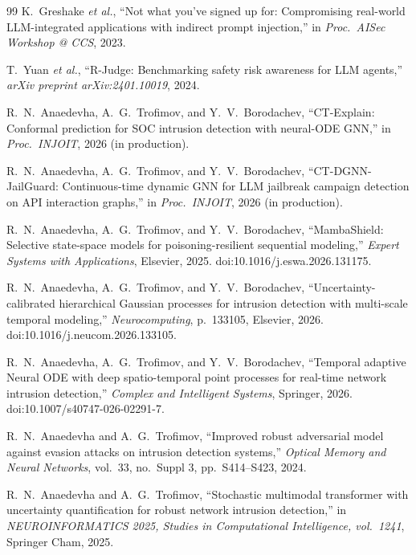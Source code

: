 \documentclass[12pt,a4paper]{article}
\theoremstyle{definition}
\theoremstyle{remark}
\begin{document}
\begin{thebibliography}{99}
K.~Greshake \emph{et al.}, ``Not what you've signed up for: Compromising real-world LLM-integrated applications with indirect prompt injection,'' in \emph{Proc.\ AISec Workshop @ CCS}, 2023.

T.~Yuan \emph{et al.}, ``{R-Judge}: Benchmarking safety risk awareness for LLM agents,'' \emph{arXiv preprint arXiv:2401.10019}, 2024.

R.~N.~Anaedevha, A.~G.~Trofimov, and Y.~V.~Borodachev, ``CT-Explain: Conformal prediction for SOC intrusion detection with neural-ODE GNN,'' in \emph{Proc.\ INJOIT}, 2026 (in production).

R.~N.~Anaedevha, A.~G.~Trofimov, and Y.~V.~Borodachev, ``{CT-DGNN-JailGuard}: Continuous-time dynamic GNN for LLM jailbreak campaign detection on API interaction graphs,'' in \emph{Proc.\ INJOIT}, 2026 (in production).

R.~N.~Anaedevha, A.~G.~Trofimov, and Y.~V.~Borodachev, ``{MambaShield}: Selective state-space models for poisoning-resilient sequential modeling,'' \emph{Expert Systems with Applications}, Elsevier, 2025. doi:10.1016/j.eswa.2026.131175.

R.~N.~Anaedevha, A.~G.~Trofimov, and Y.~V.~Borodachev, ``Uncertainty-calibrated hierarchical {Gaussian} processes for intrusion detection with multi-scale temporal modeling,'' \emph{Neurocomputing}, p.~133105, Elsevier, 2026. doi:10.1016/j.neucom.2026.133105.

R.~N.~Anaedevha, A.~G.~Trofimov, and Y.~V.~Borodachev, ``Temporal adaptive {Neural ODE} with deep spatio-temporal point processes for real-time network intrusion detection,'' \emph{Complex and Intelligent Systems}, Springer, 2026. doi:10.1007/s40747-026-02291-7.

R.~N.~Anaedevha and A.~G.~Trofimov, ``Improved robust adversarial model against evasion attacks on intrusion detection systems,'' \emph{Optical Memory and Neural Networks}, vol.~33, no.~Suppl 3, pp.~S414--S423, 2024.

R.~N.~Anaedevha and A.~G.~Trofimov, ``Stochastic multimodal transformer with uncertainty quantification for robust network intrusion detection,'' in \emph{NEUROINFORMATICS 2025, Studies in Computational Intelligence, vol.~1241}, Springer Cham, 2025.


\end{thebibliography}
\end{document}
